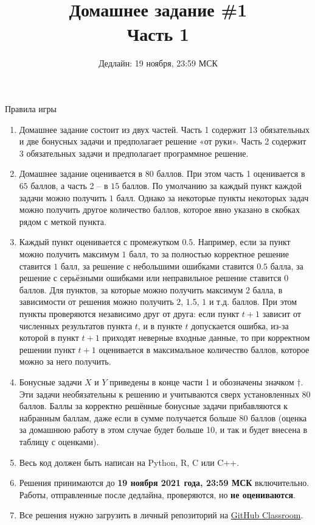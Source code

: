 \documentclass[10pt, a4paper]{extarticle}
\title{\vspace{-2em}{\normalsize Прикладная статистика в машинном обучении} \\\vspace{0.5em} Домашнее задание \#1 \vspace{0.2em}\\ \Large Часть 1}
\author{Дедлайн: 19 ноября, 23:59 МСК}
\date{\rule{15cm}{0.4pt}}
\begin{document}
	
	\maketitle
	
	\vspace{-2em}
	\begin{rulesbox}{Правила игры}
		\begin{enumerate}
			\item Домашнее задание состоит из двух частей. Часть 1 содержит 13 обязательных и две бонусных задачи и предполагает решение «от руки». Часть 2 содержит 3 обязательных задачи и предполагает программное решение.
			\item Домашнее задание оценивается в $80$ баллов. При этом часть 1 оценивается в $65$ баллов, а часть 2 – в $15$ баллов. По умолчанию за каждый пункт каждой задачи можно получить $1$ балл. Однако за некоторые пункты некоторых задач можно получить другое количество баллов, которое явно указано в скобках рядом с меткой пункта.
			\item Каждый пункт оценивается с промежутком $0.5$. Например, если за пункт можно получить максимум $1$ балл, то за полностью корректное решение ставится $1$ балл, за решение с небольшими ошибками ставится $0.5$ балла, за решение с серьёзными ошибками или неправильное решение ставится $0$ баллов. Для пунктов, за которые можно получить максимум $2$ балла, в зависимости от решения можно получить $2$, $1.5$, $1$ и т.д. баллов. При этом пункты проверяются независимо друг от друга: если пункт $t+1$ зависит от численных результатов пункта $t$, и в пункте $t$ допускается ошибка, из-за которой в пункт $t+1$ приходят неверные входные данные, то при корректном решении пункт $t+1$ оценивается в максимальное количество баллов, которое можно за него получить.
			\item Бонусные задачи $X$ и $Y$ приведены в конце части 1 и обозначены значком $\dagger$. Эти задачи необязательны к решению и учитываются сверх установленных $80$ баллов. Баллы за корректно решённые бонусные задачи прибавляются к набранным баллам, даже если в сумме получается больше $80$ баллов (оценка за домашнюю работу в этом случае будет больше 10, и так и будет внесена в таблицу с оценками).
			\item Весь код должен быть написан на Python, R, C или C++.
			\item Решения принимаются до \textbf{19 ноября 2021 года, 23:59 МСК} включительно.
			Работы, отправленные после дедлайна, проверяются, но \textbf{не оцениваются}.
			\item Все решения нужно загрузить в личный репозиторий на \href{https://classroom.github.com/a/KZaAKjaA}{GitHub Classroom}.

\end{enumerate}
\end{rulesbox}
\end{document}
